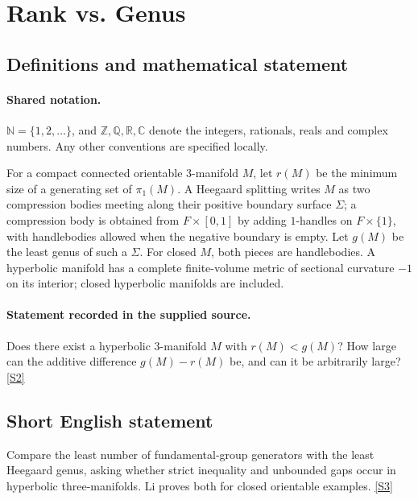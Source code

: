 \documentclass[11pt]{article}
\newcommand{\sref}[2]{\hyperlink{source:#1:#2}{[S#2]}}
\begin{document}
\section{Rank vs. Genus}\label{statement}

\subsection{Definitions and mathematical statement}

\paragraph{Shared notation.}$\mathbb N=\{1,2,\ldots\}$, and $\mathbb Z,\mathbb Q,\mathbb R,\mathbb C$ denote the integers, rationals, reals and complex numbers. Any other conventions are specified locally.


For a compact connected orientable $3$-manifold $M$, let $r(M)$ be the minimum size of a generating set of $\pi_1(M)$. A Heegaard splitting writes $M$ as two compression bodies meeting along their positive boundary surface $\Sigma$; a compression body is obtained from $F\times[0,1]$ by adding $1$-handles on $F\times\{1\}$, with handlebodies allowed when the negative boundary is empty. Let $g(M)$ be the least genus of such a $\Sigma$. For closed $M$, both pieces are handlebodies. A hyperbolic manifold has a complete finite-volume metric of sectional curvature $-1$ on its interior; closed hyperbolic manifolds are included.
\paragraph{Statement recorded in the supplied source.}
Does there exist a hyperbolic $3$-manifold $M$ with $r(M)<g(M)$? How large can the additive difference $g(M)-r(M)$ be, and can it be arbitrarily large? \sref{statement}{2}
\subsection{Short English statement}
Compare the least number of fundamental-group generators with the least Heegaard genus, asking whether strict inequality and unbounded gaps occur in hyperbolic three-manifolds. Li proves both for closed orientable examples. \sref{statement}{3}
\end{document}
